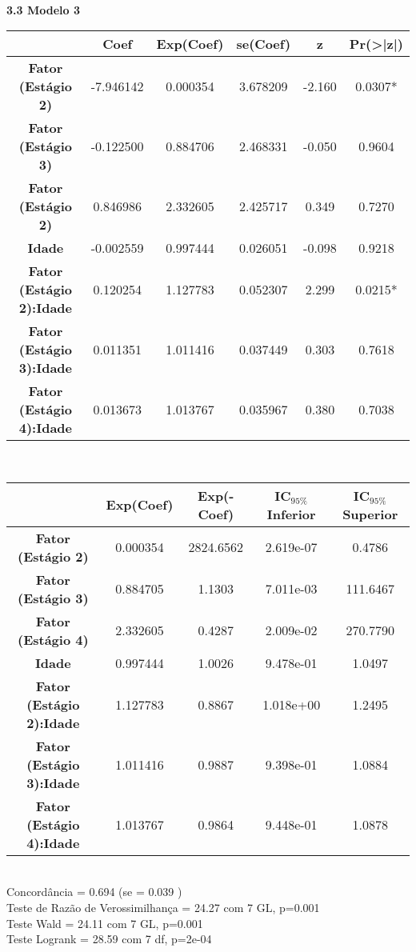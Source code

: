 \documentclass[12pt,a4paper]{article}
\begin{document}
	\vspace{2cm}\\
	\textbf{3.3 Modelo 3}\\
 	\begin{center}
 			\begin{tabular}{|c|c|c|c|c|c|}\hline
 				& \textbf{Coef} & \textbf{Exp(Coef)} & \textbf{se(Coef)} & \textbf{z} & \textbf{Pr(>|z|)}\\ \hline
 				\textbf{Fator (Estágio 2)} & -7.946142 & 0.000354 & 3.678209 & -2.160 & 0.0307*\\ \hline
 				\textbf{Fator (Estágio 3)} & -0.122500 & 0.884706 & 2.468331 & -0.050 & 0.9604\\ \hline  
 				\textbf{Fator (Estágio 2)} & 0.846986 & 2.332605 & 2.425717 & 0.349 & 0.7270\\ \hline  
 				\textbf{Idade} & -0.002559 & 0.997444 & 0.026051 & -0.098 & 0.9218\\ \hline  
 				\textbf{Fator (Estágio 2):Idade} & 0.120254 & 1.127783 & 0.052307 & 2.299 & 0.0215*\\ \hline
 				\textbf{Fator (Estágio 3):Idade} & 0.011351 & 1.011416 & 0.037449 & 0.303 & 0.7618\\ \hline  
 				\textbf{Fator (Estágio 4):Idade} &  0.013673 & 1.013767 & 0.035967 & 0.380 & 0.7038\\ \hline
 			\end{tabular}
 			\vspace{1cm}\\
 			\begin{tabular}{|c|c|c|c|c|}\hline
 				& \textbf{Exp(Coef)} & \textbf{Exp(-Coef)} & \textbf{IC$_{95\%}$ Inferior} & \textbf{IC$_{95\%}$ Superior}\\ \hline
 				\textbf{Fator (Estágio 2)} & 0.000354 & 2824.6562 & 2.619e-07 & 0.4786\\ \hline
 				\textbf{Fator (Estágio 3)} &  0.884705 & 1.1303 & 7.011e-03 & 111.6467\\ \hline
 				\textbf{Fator (Estágio 4)} & 2.332605 & 0.4287 & 2.009e-02 & 270.7790\\ \hline
 				\textbf{Idade} & 0.997444 & 1.0026 & 9.478e-01 & 1.0497\\ \hline
 				\textbf{Fator (Estágio 2):Idade} & 1.127783 & 0.8867 & 1.018e+00 & 1.2495\\ \hline
 				\textbf{Fator (Estágio 3):Idade} & 1.011416 & 0.9887 & 9.398e-01 & 1.0884\\ \hline
 				\textbf{Fator (Estágio 4):Idade} & 1.013767 & 0.9864 & 9.448e-01 & 1.0878\\ \hline
 			\end{tabular}
 		\vspace{0.25cm}\\
 		Concordância = 0.694  (se = 0.039 )\\
 		Teste de Razão de Verossimilhança = 24.27  com 7 GL,   p=0.001\\
 		Teste Wald = 24.11  com 7 GL,   p=0.001\\
 		Teste Logrank = 28.59  com 7 df,   p=2e-04\\
 	\end{center}
\end{document}
